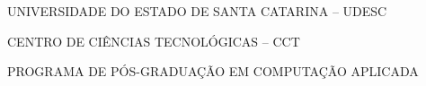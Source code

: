 

\renewcommand{\imprimircapa}{%
	\begin{capa}%
		\center

		{\fontseries{b}\selectfont\MakeTextUppercase{UNIVERSIDADE DO ESTADO DE SANTA CATARINA -- UDESC}}
		
		{\fontseries{b}\selectfont\MakeTextUppercase{CENTRO DE CIÊNCIAS TECNOLÓGICAS -- CCT}}

		{\fontseries{b}\selectfont\MakeTextUppercase{PROGRAMA DE PÓS-GRADUAÇÃO EM COMPUTAÇÃO APLICADA}}
		
		\vfill
		
		{\fontseries{b}\selectfont\MakeTextUppercase{\normalsize\imprimirautor}}
		
		\vfill
		\begin{center}
			{\fontseries{b}\selectfont\MakeTextUppercase{\imprimirtitulo}}
		\end{center}
		\vfill
		
		\vfill
		
		{\fontseries{b}\selectfont\MakeTextUppercase{\imprimirlocal}}
		\par
		{\selectfont \imprimirdata}
		\vspace*{1cm}
	\end{capa}
}



\imprimircapa				%

